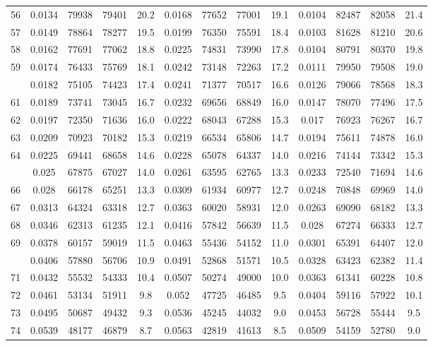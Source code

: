 \documentclass[
  14pt,
]{article}
\begin{document}
\begin{longtable}[t]{lcccccccccccc}
56 & 0.0134 & 79938 & 79401 & 20.2 & 0.0168 & 77652 & 77001 & 19.1 & 0.0104 & 82487 & 82058 & 21.4\\
57 & 0.0149 & 78864 & 78277 & 19.5 & 0.0199 & 76350 & 75591 & 18.4 & 0.0103 & 81628 & 81210 & 20.6\\
58 & 0.0162 & 77691 & 77062 & 18.8 & 0.0225 & 74831 & 73990 & 17.8 & 0.0104 & 80791 & 80370 & 19.8\\
59 & 0.0174 & 76433 & 75769 & 18.1 & 0.0242 & 73148 & 72263 & 17.2 & 0.0111 & 79950 & 79508 & 19.0\\
\addlinespace
60 & 0.0182 & 75105 & 74423 & 17.4 & 0.0241 & 71377 & 70517 & 16.6 & 0.0126 & 79066 & 78568 & 18.3\\
61 & 0.0189 & 73741 & 73045 & 16.7 & 0.0232 & 69656 & 68849 & 16.0 & 0.0147 & 78070 & 77496 & 17.5\\
62 & 0.0197 & 72350 & 71636 & 16.0 & 0.0222 & 68043 & 67288 & 15.3 & 0.017 & 76923 & 76267 & 16.7\\
63 & 0.0209 & 70923 & 70182 & 15.3 & 0.0219 & 66534 & 65806 & 14.7 & 0.0194 & 75611 & 74878 & 16.0\\
64 & 0.0225 & 69441 & 68658 & 14.6 & 0.0228 & 65078 & 64337 & 14.0 & 0.0216 & 74144 & 73342 & 15.3\\
\addlinespace
65 & 0.025 & 67875 & 67027 & 14.0 & 0.0261 & 63595 & 62765 & 13.3 & 0.0233 & 72540 & 71694 & 14.6\\
66 & 0.028 & 66178 & 65251 & 13.3 & 0.0309 & 61934 & 60977 & 12.7 & 0.0248 & 70848 & 69969 & 14.0\\
67 & 0.0313 & 64324 & 63318 & 12.7 & 0.0363 & 60020 & 58931 & 12.0 & 0.0263 & 69090 & 68182 & 13.3\\
68 & 0.0346 & 62313 & 61235 & 12.1 & 0.0416 & 57842 & 56639 & 11.5 & 0.028 & 67274 & 66333 & 12.7\\
69 & 0.0378 & 60157 & 59019 & 11.5 & 0.0463 & 55436 & 54152 & 11.0 & 0.0301 & 65391 & 64407 & 12.0\\
\addlinespace
70 & 0.0406 & 57880 & 56706 & 10.9 & 0.0491 & 52868 & 51571 & 10.5 & 0.0328 & 63423 & 62382 & 11.4\\
71 & 0.0432 & 55532 & 54333 & 10.4 & 0.0507 & 50274 & 49000 & 10.0 & 0.0363 & 61341 & 60228 & 10.8\\
72 & 0.0461 & 53134 & 51911 & 9.8 & 0.052 & 47725 & 46485 & 9.5 & 0.0404 & 59116 & 57922 & 10.1\\
73 & 0.0495 & 50687 & 49432 & 9.3 & 0.0536 & 45245 & 44032 & 9.0 & 0.0453 & 56728 & 55444 & 9.5\\
74 & 0.0539 & 48177 & 46879 & 8.7 & 0.0563 & 42819 & 41613 & 8.5 & 0.0509 & 54159 & 52780 & 9.0\\

\end{longtable}
\end{document}
